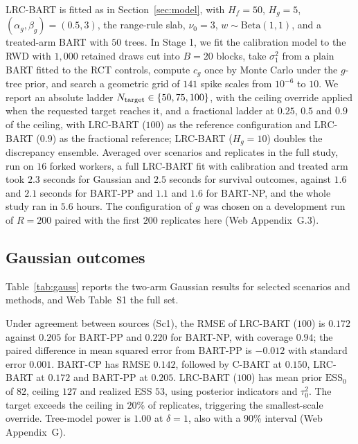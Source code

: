 \documentclass[11pt]{article}
\theoremstyle{definition}
\theoremstyle{plain}
\begin{document}
LRC-BART is fitted as in Section~\ref{sec:model}, with $H_f=50$, $H_g=5$, $(\alpha_g,\beta_g)=(0.5,3)$, the range-rule slab, $\nu_0=3$, $w\sim\mathrm{Beta}(1,1)$, and a treated-arm BART with $50$ trees. In Stage 1, we fit the calibration model to the RWD with $1{,}000$ retained draws cut into $B=20$ blocks, take $\sigma_1^2$ from a plain BART fitted to the RCT controls, compute $c_g$ once by Monte Carlo under the $g$-tree prior, and search a geometric grid of $141$ spike scales from $10^{-6}$ to $10$. We report an absolute ladder $N_{\rm target}\in\{50,75,100\}$, with the ceiling override applied when the requested target reaches it, and a fractional ladder at $0.25$, $0.5$ and $0.9$ of the ceiling, with LRC-BART ($100$) as the reference configuration and LRC-BART ($0.9$) as the fractional reference; LRC-BART ($H_g=10$) doubles the discrepancy ensemble. Averaged over scenarios and replicates in the full study, run on $16$ forked workers, a full LRC-BART fit with calibration and treated arm took $2.3$ seconds for Gaussian and $2.5$ seconds for survival outcomes, against $1.6$ and $2.1$ seconds for BART-PP and $1.1$ and $1.6$ for BART-NP, and the whole study ran in $5.6$ hours. The configuration of $g$ was chosen on a development run of $R=200$ paired with the first $200$ replicates here (Web Appendix~G.3).

\subsection{Gaussian outcomes}
\label{sec:sim_gauss}

Table~\ref{tab:gauss} reports the two-arm Gaussian results for selected scenarios and methods, and Web Table~S1 the full set.

Under agreement between sources (Sc1), the RMSE of LRC-BART ($100$) is $0.172$ against $0.205$ for BART-PP and $0.220$ for BART-NP, with coverage $0.94$; the paired difference in mean squared error from BART-PP is $-0.012$ with standard error $0.001$. BART-CP has RMSE $0.142$, followed by C-BART at $0.150$, LRC-BART at $0.172$ and BART-PP at $0.205$. LRC-BART ($100$) has mean prior $\mathrm{ESS}_0$ of $82$, ceiling $127$ and realized ESS $53$, using posterior indicators and $\tau_0^2$. The target exceeds the ceiling in $20\%$ of replicates, triggering the smallest-scale override. Tree-model power is $1.00$ at $\delta=1$, also with a 90\% interval (Web Appendix~G).
\end{document}
